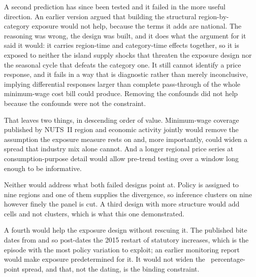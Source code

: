 A second prediction has since been tested and it failed in the more useful
direction. An earlier version argued that building the structural
region-by-category exposure would not help, because the terms it adds are
national. The reasoning was wrong, the design was built, and it does what the
argument for it said it would: it carries region-time and category-time effects
together, so it is exposed to neither the island supply shocks that threaten the
exposure design nor the seasonal cycle that defeats the category one. It still
cannot identify a price response, and it fails in a way that is diagnostic
rather than merely inconclusive, implying differential responses larger than
complete pass-through of the whole minimum-wage cost bill could produce.
Removing the confounds did not help because the confounds were not the
constraint.

That leaves two things, in descending order of value.
Minimum-wage coverage published by NUTS~II region and economic activity jointly
would remove the assumption the exposure measure rests on and, more importantly,
could widen a spread that industry mix alone cannot. And a longer regional price
series at consumption-purpose detail would allow pre-trend testing over a window
long enough to be informative.

Neither would address what both failed designs point at. Policy is assigned to
nine regions and one of them supplies the divergence, so inference clusters on
nine however finely the panel is cut. A third design with more structure would
add cells and not clusters, which is what this one demonstrated.

A fourth would help the exposure design without rescuing it. The published bite
dates from \ExposureBitePeriod{} and so post-dates the 2015 restart of statutory
increases, which is the episode with the most policy variation to exploit; an
earlier monitoring report would make exposure predetermined for it. It would not
widen the \ExposureSpreadPP{}~percentage-point spread, and that, not the dating,
is the binding constraint.
